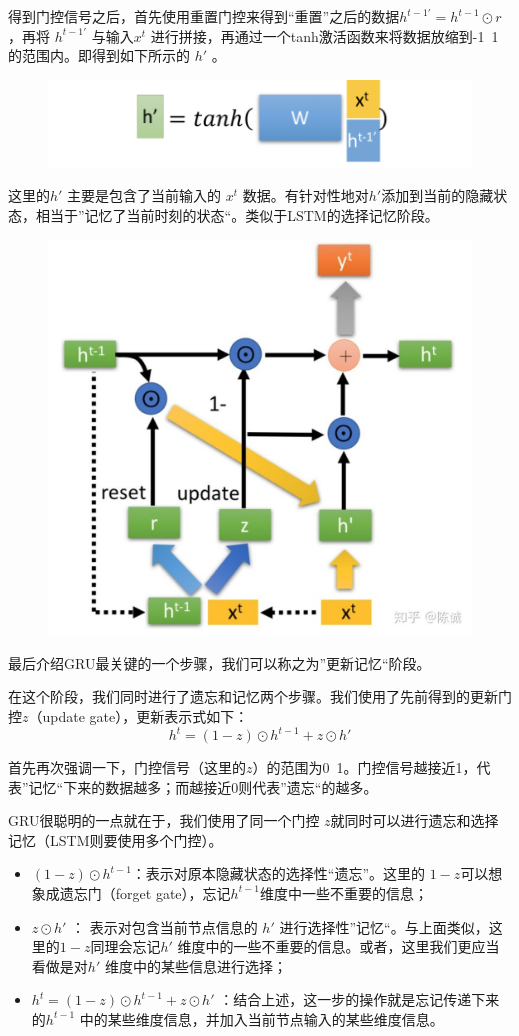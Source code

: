 \documentclass[12pt]{article}
\begin{document}
得到门控信号之后，首先使用重置门控来得到“重置”之后的数据$h^{{t-1}'} = h^{t-1}\odot r$ ，再将 $h^{{t-1}'} $ 与输入$x^t$ 进行拼接，再通过一个tanh激活函数来将数据放缩到-1~1的范围内。即得到如下所示的 $h'$ 。
\begin{figure}[H]
    \centering
    \includegraphics[width=.6\textwidth]{fig/GRU_h_pie.png}
\end{figure}

这里的$h'$ 主要是包含了当前输入的 $x^t$ 数据。有针对性地对$h'$添加到当前的隐藏状态，相当于”记忆了当前时刻的状态“。类似于LSTM的选择记忆阶段。
\begin{figure}[H]
    \centering
    \includegraphics[width=.6\textwidth]{fig/GRU_Internal_Structure.jpg}
\end{figure}

最后介绍GRU最关键的一个步骤，我们可以称之为”更新记忆“阶段。

在这个阶段，我们同时进行了遗忘和记忆两个步骤。我们使用了先前得到的更新门控$z$（update gate），更新表示式如下：
$$
h^t = (1-z) \odot h^{t-1} + z \odot h'
$$

首先再次强调一下，门控信号（这里的$z$）的范围为0~1。门控信号越接近1，代表”记忆“下来的数据越多；而越接近0则代表”遗忘“的越多。

GRU很聪明的一点就在于，我们使用了同一个门控 $z$就同时可以进行遗忘和选择记忆（LSTM则要使用多个门控）。
\begin{itemize}
\setlength{\itemsep}{0pt}
\setlength{\parsep}{0pt}
\setlength{\parskip}{0pt}
    \item $ (1-z) \odot h^{t-1}$：表示对原本隐藏状态的选择性“遗忘”。这里的 $1-z$可以想象成遗忘门（forget gate），忘记$h^{t-1}$维度中一些不重要的信息；
    \item $z \odot h'$ ： 表示对包含当前节点信息的 $h'$ 进行选择性”记忆“。与上面类似，这里的$1-z$同理会忘记$h'$  维度中的一些不重要的信息。或者，这里我们更应当看做是对$h'$  维度中的某些信息进行选择；
    \item $h^t = (1-z) \odot h^{t-1} + z \odot h'$ ：结合上述，这一步的操作就是忘记传递下来的$h^{t-1}$ 中的某些维度信息，并加入当前节点输入的某些维度信息。
\end{itemize}




\end{document}
